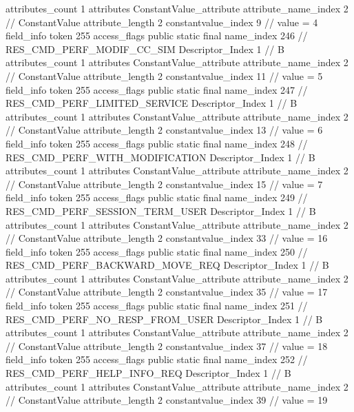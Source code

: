 {{{{{				attributes_count	1
				attributes {
				ConstantValue_attribute {
					attribute_name_index	2		// ConstantValue
					attribute_length	2
					constantvalue_index	9		// value = 4
				}
				}
			}
			field_info {
				token	255
				access_flags	public static final
				name_index	246		// RES_CMD_PERF_MODIF_CC_SIM
				Descriptor_Index	1		// B
				attributes_count	1
				attributes {
				ConstantValue_attribute {
					attribute_name_index	2		// ConstantValue
					attribute_length	2
					constantvalue_index	11		// value = 5
				}
				}
			}
			field_info {
				token	255
				access_flags	public static final
				name_index	247		// RES_CMD_PERF_LIMITED_SERVICE
				Descriptor_Index	1		// B
				attributes_count	1
				attributes {
				ConstantValue_attribute {
					attribute_name_index	2		// ConstantValue
					attribute_length	2
					constantvalue_index	13		// value = 6
				}
				}
			}
			field_info {
				token	255
				access_flags	public static final
				name_index	248		// RES_CMD_PERF_WITH_MODIFICATION
				Descriptor_Index	1		// B
				attributes_count	1
				attributes {
				ConstantValue_attribute {
					attribute_name_index	2		// ConstantValue
					attribute_length	2
					constantvalue_index	15		// value = 7
				}
				}
			}
			field_info {
				token	255
				access_flags	public static final
				name_index	249		// RES_CMD_PERF_SESSION_TERM_USER
				Descriptor_Index	1		// B
				attributes_count	1
				attributes {
				ConstantValue_attribute {
					attribute_name_index	2		// ConstantValue
					attribute_length	2
					constantvalue_index	33		// value = 16
				}
				}
			}
			field_info {
				token	255
				access_flags	public static final
				name_index	250		// RES_CMD_PERF_BACKWARD_MOVE_REQ
				Descriptor_Index	1		// B
				attributes_count	1
				attributes {
				ConstantValue_attribute {
					attribute_name_index	2		// ConstantValue
					attribute_length	2
					constantvalue_index	35		// value = 17
				}
				}
			}
			field_info {
				token	255
				access_flags	public static final
				name_index	251		// RES_CMD_PERF_NO_RESP_FROM_USER
				Descriptor_Index	1		// B
				attributes_count	1
				attributes {
				ConstantValue_attribute {
					attribute_name_index	2		// ConstantValue
					attribute_length	2
					constantvalue_index	37		// value = 18
				}
				}
			}
			field_info {
				token	255
				access_flags	public static final
				name_index	252		// RES_CMD_PERF_HELP_INFO_REQ
				Descriptor_Index	1		// B
				attributes_count	1
				attributes {
				ConstantValue_attribute {
					attribute_name_index	2		// ConstantValue
					attribute_length	2
					constantvalue_index	39		// value = 19
}}}}}}}
